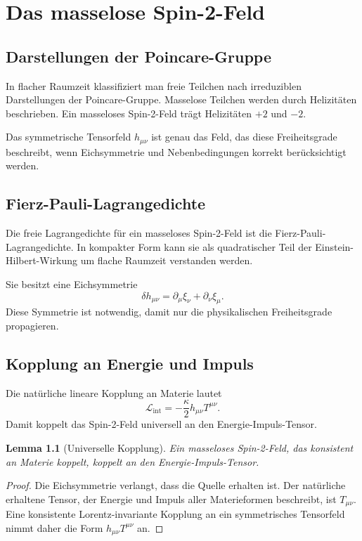\documentclass[11pt,a4paper]{book}
\newtheorem{lemma}{Lemma}[chapter]
\theoremstyle{remark}
\newcommand{\Lag}{\mathcal{L}}
\begin{document}
\chapter{Das masselose Spin-2-Feld}
\section{Darstellungen der Poincare-Gruppe}
In flacher Raumzeit klassifiziert man freie Teilchen nach irreduziblen Darstellungen der Poincare-Gruppe. Masselose Teilchen werden durch Helizitäten beschrieben. Ein masseloses Spin-2-Feld trägt Helizitäten $+2$ und $-2$.

Das symmetrische Tensorfeld $h_{\mu\nu}$ ist genau das Feld, das diese Freiheitsgrade beschreibt, wenn Eichsymmetrie und Nebenbedingungen korrekt berücksichtigt werden.

\section{Fierz-Pauli-Lagrangedichte}
Die freie Lagrangedichte für ein masseloses Spin-2-Feld ist die Fierz-Pauli-Lagrangedichte. In kompakter Form kann sie als quadratischer Teil der Einstein-Hilbert-Wirkung um flache Raumzeit verstanden werden.

Sie besitzt eine Eichsymmetrie
\begin{equation}
\delta h_{\mu\nu}=\partial_\mu\xi_\nu+\partial_\nu\xi_\mu.
\end{equation}
Diese Symmetrie ist notwendig, damit nur die physikalischen Freiheitsgrade propagieren.

\section{Kopplung an Energie und Impuls}
Die natürliche lineare Kopplung an Materie lautet
\begin{equation}
\Lag_{\mathrm{int}}=-\frac{\kappa}{2}h_{\mu\nu}T^{\mu\nu}.
\end{equation}
Damit koppelt das Spin-2-Feld universell an den Energie-Impuls-Tensor.

\begin{lemma}[Universelle Kopplung]
Ein masseloses Spin-2-Feld, das konsistent an Materie koppelt, koppelt an den Energie-Impuls-Tensor.
\end{lemma}

\begin{proof}
Die Eichsymmetrie verlangt, dass die Quelle erhalten ist. Der natürliche erhaltene Tensor, der Energie und Impuls aller Materieformen beschreibt, ist $T_{\mu\nu}$. Eine konsistente Lorentz-invariante Kopplung an ein symmetrisches Tensorfeld nimmt daher die Form $h_{\mu\nu}T^{\mu\nu}$ an.
\end{proof}
\end{document}
